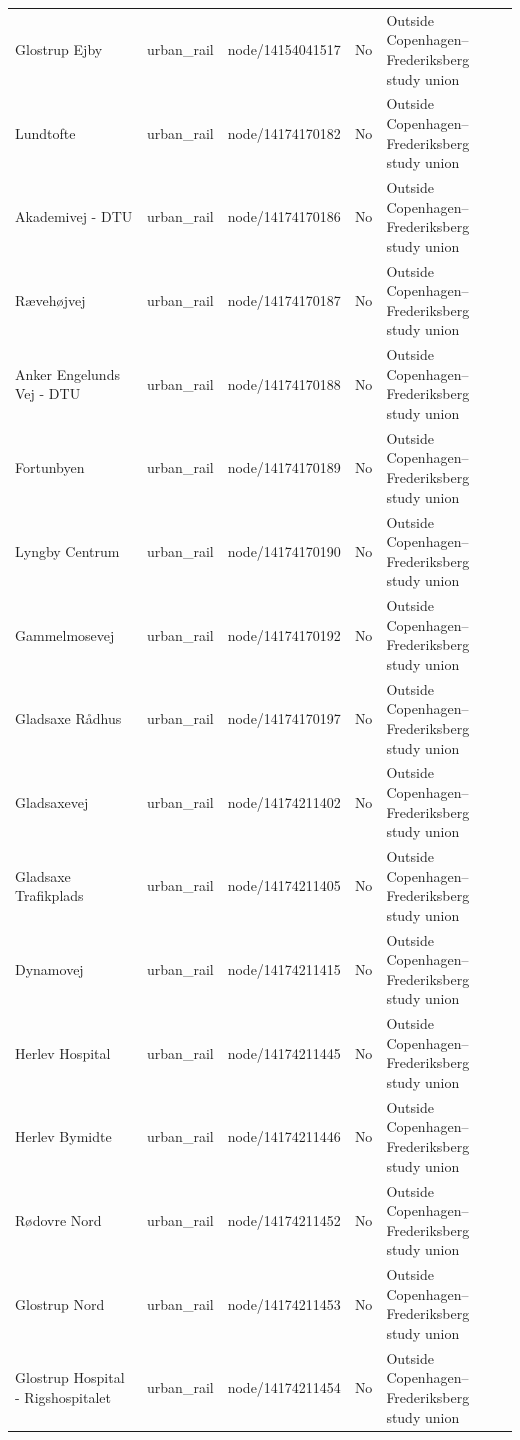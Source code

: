 \begin{landscape}
\begin{longtable}{>{\raggedright\arraybackslash}p{8.0cm}>{\raggedright\arraybackslash}p{2.4cm}>{\raggedright\arraybackslash}p{3.7cm}>{\raggedright\arraybackslash}p{1.5cm}>{\raggedright\arraybackslash}p{5.2cm}}
Glostrup Ejby & urban\_\allowbreak{}rail & node/14154041517 & No & Outside Copenhagen--Frederiksberg study union \\
Lundtofte & urban\_\allowbreak{}rail & node/14174170182 & No & Outside Copenhagen--Frederiksberg study union \\
Akademivej - DTU & urban\_\allowbreak{}rail & node/14174170186 & No & Outside Copenhagen--Frederiksberg study union \\
Rævehøjvej & urban\_\allowbreak{}rail & node/14174170187 & No & Outside Copenhagen--Frederiksberg study union \\
Anker Engelunds Vej - DTU & urban\_\allowbreak{}rail & node/14174170188 & No & Outside Copenhagen--Frederiksberg study union \\
Fortunbyen & urban\_\allowbreak{}rail & node/14174170189 & No & Outside Copenhagen--Frederiksberg study union \\
Lyngby Centrum & urban\_\allowbreak{}rail & node/14174170190 & No & Outside Copenhagen--Frederiksberg study union \\
Gammelmosevej & urban\_\allowbreak{}rail & node/14174170192 & No & Outside Copenhagen--Frederiksberg study union \\
Gladsaxe Rådhus & urban\_\allowbreak{}rail & node/14174170197 & No & Outside Copenhagen--Frederiksberg study union \\
Gladsaxevej & urban\_\allowbreak{}rail & node/14174211402 & No & Outside Copenhagen--Frederiksberg study union \\
Gladsaxe Trafikplads & urban\_\allowbreak{}rail & node/14174211405 & No & Outside Copenhagen--Frederiksberg study union \\
Dynamovej & urban\_\allowbreak{}rail & node/14174211415 & No & Outside Copenhagen--Frederiksberg study union \\
Herlev Hospital & urban\_\allowbreak{}rail & node/14174211445 & No & Outside Copenhagen--Frederiksberg study union \\
Herlev Bymidte & urban\_\allowbreak{}rail & node/14174211446 & No & Outside Copenhagen--Frederiksberg study union \\
Rødovre Nord & urban\_\allowbreak{}rail & node/14174211452 & No & Outside Copenhagen--Frederiksberg study union \\
Glostrup Nord & urban\_\allowbreak{}rail & node/14174211453 & No & Outside Copenhagen--Frederiksberg study union \\
Glostrup Hospital - Rigshospitalet & urban\_\allowbreak{}rail & node/14174211454 & No & Outside Copenhagen--Frederiksberg study union \\

\end{longtable}
\end{landscape}
